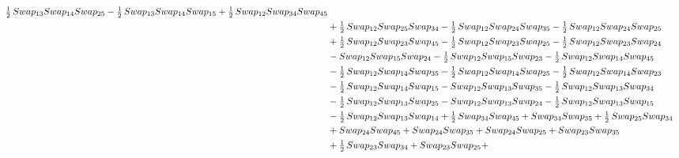 \documentclass[10pt,a4paper]{amsart}
\begin{document}
\begin{align*}
        \tfrac12\,\textnormal{Swap}_{13} \textnormal{Swap}_{14} \textnormal{Swap}_{25}  - \tfrac12\,\textnormal{Swap}_{13} \textnormal{Swap}_{14} \textnormal{Swap}_{15} + \tfrac12\,\textnormal{Swap}_{12} \textnormal{Swap}_{34} \textnormal{Swap}_{45} \\ & + \tfrac12\,\textnormal{Swap}_{12} \textnormal{Swap}_{25} \textnormal{Swap}_{34} -
        \tfrac12\,\textnormal{Swap}_{12} \textnormal{Swap}_{24} \textnormal{Swap}_{35} - \tfrac12\,\textnormal{Swap}_{12} \textnormal{Swap}_{24} \textnormal{Swap}_{25}\\ & + \tfrac12\,\textnormal{Swap}_{12} \textnormal{Swap}_{23} \textnormal{Swap}_{45} - \tfrac12\,\textnormal{Swap}_{12} \textnormal{Swap}_{23} \textnormal{Swap}_{25} -
        \tfrac12\,\textnormal{Swap}_{12} \textnormal{Swap}_{23} \textnormal{Swap}_{24}\\ & - \textnormal{Swap}_{12} \textnormal{Swap}_{15} \textnormal{Swap}_{24} - \tfrac12\,\textnormal{Swap}_{12} \textnormal{Swap}_{15} \textnormal{Swap}_{23} - \tfrac12\,\textnormal{Swap}_{12} \textnormal{Swap}_{14} \textnormal{Swap}_{45}\\ & -
        \tfrac12\,\textnormal{Swap}_{12} \textnormal{Swap}_{14} \textnormal{Swap}_{35} - \tfrac12\,\textnormal{Swap}_{12} \textnormal{Swap}_{14} \textnormal{Swap}_{25} - \tfrac12\,\textnormal{Swap}_{12} \textnormal{Swap}_{14} \textnormal{Swap}_{23}\\ & - \tfrac12\,\textnormal{Swap}_{12} \textnormal{Swap}_{14} \textnormal{Swap}_{15}-
        \textnormal{Swap}_{12} \textnormal{Swap}_{13} \textnormal{Swap}_{35} - \tfrac12\,\textnormal{Swap}_{12} \textnormal{Swap}_{13} \textnormal{Swap}_{34} \\ & - \tfrac12\,\textnormal{Swap}_{12} \textnormal{Swap}_{13} \textnormal{Swap}_{25} - \textnormal{Swap}_{12} \textnormal{Swap}_{13} \textnormal{Swap}_{24} -
        \tfrac12\,\textnormal{Swap}_{12} \textnormal{Swap}_{13} \textnormal{Swap}_{15}\\ & - \tfrac12\,\textnormal{Swap}_{12} \textnormal{Swap}_{13} \textnormal{Swap}_{14} + \tfrac12\,\textnormal{Swap}_{34} \textnormal{Swap}_{45} + \textnormal{Swap}_{34} \textnormal{Swap}_{35} + \tfrac12\,\textnormal{Swap}_{25} \textnormal{Swap}_{34}\\ &
          + \textnormal{Swap}_{24} \textnormal{Swap}_{45}  + \textnormal{Swap}_{24} \textnormal{Swap}_{35} + \textnormal{Swap}_{24} \textnormal{Swap}_{25} + \textnormal{Swap}_{23} \textnormal{Swap}_{35}\\ & + \tfrac12\,\textnormal{Swap}_{23} \textnormal{Swap}_{34} + \textnormal{Swap}_{23} \textnormal{Swap}_{25} +

\end{align*}
\end{document}
